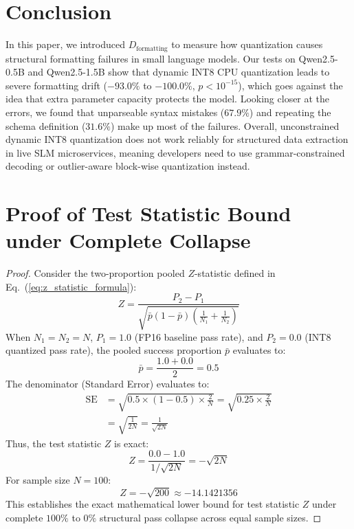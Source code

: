 \documentclass[10pt,journal,compsoc]{IEEEtran}
\begin{document}
\section{Conclusion}
In this paper, we introduced $D_{\text{formatting}}$ to measure how quantization causes structural formatting failures in small language models. Our tests on Qwen2.5-0.5B and Qwen2.5-1.5B show that dynamic INT8 CPU quantization leads to severe formatting drift ($-93.0\%$ to $-100.0\%$, $p < 10^{-15}$), which goes against the idea that extra parameter capacity protects the model. Looking closer at the errors, we found that unparseable syntax mistakes ($67.9\%$) and repeating the schema definition ($31.6\%$) make up most of the failures. Overall, unconstrained dynamic INT8 quantization does not work reliably for structured data extraction in live SLM microservices, meaning developers need to use grammar-constrained decoding or outlier-aware block-wise quantization instead.


\appendices

\section{Proof of Test Statistic Bound under Complete Collapse}
\begin{proof}
Consider the two-proportion pooled $Z$-statistic defined in Eq.~(\ref{eq:z_statistic_formula}):
\begin{equation}
    Z = \frac{P_2 - P_1}{\sqrt{\bar{p}(1 - \bar{p})\left(\frac{1}{N_1} + \frac{1}{N_2}\right)}}
\end{equation}
When $N_1 = N_2 = N$, $P_1 = 1.0$ (FP16 baseline pass rate), and $P_2 = 0.0$ (INT8 quantized pass rate), the pooled success proportion $\bar{p}$ evaluates to:
\begin{equation}
    \bar{p} = \frac{1.0 + 0.0}{2} = 0.5
\end{equation}
The denominator (Standard Error) evaluates to:
\begin{equation}
\begin{split}
    \text{SE} &= \sqrt{0.5 \times (1 - 0.5) \times \frac{2}{N}} = \sqrt{0.25 \times \frac{2}{N}} \\
              &= \sqrt{\frac{1}{2N}} = \frac{1}{\sqrt{2N}}
\end{split}
\end{equation}
Thus, the test statistic $Z$ is exact:
\begin{equation}
    Z = \frac{0.0 - 1.0}{1 / \sqrt{2N}} = -\sqrt{2N}
\end{equation}
For sample size $N=100$:
\begin{equation}
    Z = -\sqrt{200} \approx -14.1421356
\end{equation}
This establishes the exact mathematical lower bound for test statistic $Z$ under complete $100\%$ to $0\%$ structural pass collapse across equal sample sizes.
\end{proof}
\end{document}
